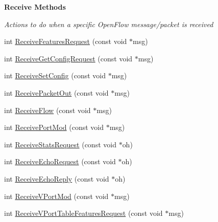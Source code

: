 \begin{Indent}{\bf Receive Methods}\par
{\em Actions to do when a specific Open\+Flow message/packet is received }\begin{DoxyCompactItemize}
\item 
int \hyperlink{classns3_1_1OpenFlowSwitchNetDevice_a09ba9303265d1aacfae6e24013f77462}{Receive\+Features\+Request} (const void $\ast$msg)
\item 
int \hyperlink{classns3_1_1OpenFlowSwitchNetDevice_a0d8c5564925fad43196827cb27dc9321}{Receive\+Get\+Config\+Request} (const void $\ast$msg)
\item 
int \hyperlink{classns3_1_1OpenFlowSwitchNetDevice_a2adbeaea746d9f030ac533e379eabac6}{Receive\+Set\+Config} (const void $\ast$msg)
\item 
int \hyperlink{classns3_1_1OpenFlowSwitchNetDevice_a73352d19efcef02dfda83fa6f0c933ac}{Receive\+Packet\+Out} (const void $\ast$msg)
\item 
int \hyperlink{classns3_1_1OpenFlowSwitchNetDevice_af25cefacfa323041ac1900c7abb06785}{Receive\+Flow} (const void $\ast$msg)
\item 
int \hyperlink{classns3_1_1OpenFlowSwitchNetDevice_a745d4c09c59eef1a76f78ee46d7b7b6a}{Receive\+Port\+Mod} (const void $\ast$msg)
\item 
int \hyperlink{classns3_1_1OpenFlowSwitchNetDevice_a2927985da87ca33b12ba1a106678aaf0}{Receive\+Stats\+Request} (const void $\ast$oh)
\item 
int \hyperlink{classns3_1_1OpenFlowSwitchNetDevice_aaef615440698c5163df4a4d05346c3e7}{Receive\+Echo\+Request} (const void $\ast$oh)
\item 
int \hyperlink{classns3_1_1OpenFlowSwitchNetDevice_ae67bb4a4cafb05ac74fe99f0b7348f05}{Receive\+Echo\+Reply} (const void $\ast$oh)
\item 
int \hyperlink{classns3_1_1OpenFlowSwitchNetDevice_a26b0f3db2e65e2af075ec345b41c79d4}{Receive\+V\+Port\+Mod} (const void $\ast$msg)
\item 
int \hyperlink{classns3_1_1OpenFlowSwitchNetDevice_ae7deaf7a63dd1445422d11e39aaeb18c}{Receive\+V\+Port\+Table\+Features\+Request} (const void $\ast$msg)
\end{DoxyCompactItemize}
\end{Indent}
